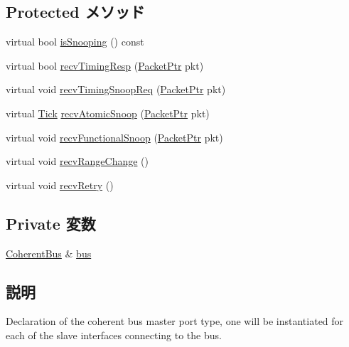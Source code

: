 \subsection*{Protected メソッド}
\begin{DoxyCompactItemize}
\item 
virtual bool \hyperlink{classCoherentBus_1_1CoherentBusMasterPort_a32602a6a3c3d66a639455036d6c08dd6}{isSnooping} () const 
\item 
virtual bool \hyperlink{classCoherentBus_1_1CoherentBusMasterPort_a197a199a6dabb291067a978d54bd2d04}{recvTimingResp} (\hyperlink{classPacket}{PacketPtr} pkt)
\item 
virtual void \hyperlink{classCoherentBus_1_1CoherentBusMasterPort_ae43c73eff109f907118829fcfa9e7096}{recvTimingSnoopReq} (\hyperlink{classPacket}{PacketPtr} pkt)
\item 
virtual \hyperlink{base_2types_8hh_a5c8ed81b7d238c9083e1037ba6d61643}{Tick} \hyperlink{classCoherentBus_1_1CoherentBusMasterPort_ae1160d8f94f042aba1dc9a07a72e1e82}{recvAtomicSnoop} (\hyperlink{classPacket}{PacketPtr} pkt)
\item 
virtual void \hyperlink{classCoherentBus_1_1CoherentBusMasterPort_af5b15bc08781cf0ba6190efc37d5b67e}{recvFunctionalSnoop} (\hyperlink{classPacket}{PacketPtr} pkt)
\item 
virtual void \hyperlink{classCoherentBus_1_1CoherentBusMasterPort_af60d9c2c17fb4c9ebc5384a7e0c9f289}{recvRangeChange} ()
\item 
virtual void \hyperlink{classCoherentBus_1_1CoherentBusMasterPort_a7ec461ad187b82b4b21e27c86e45cf9c}{recvRetry} ()
\end{DoxyCompactItemize}
\subsection*{Private 変数}
\begin{DoxyCompactItemize}
\item 
\hyperlink{classCoherentBus}{CoherentBus} \& \hyperlink{classCoherentBus_1_1CoherentBusMasterPort_a3fedef8f1565149424b7e0e4772fe8c9}{bus}
\end{DoxyCompactItemize}


\subsection{説明}
Declaration of the coherent bus master port type, one will be instantiated for each of the slave interfaces connecting to the bus. 

